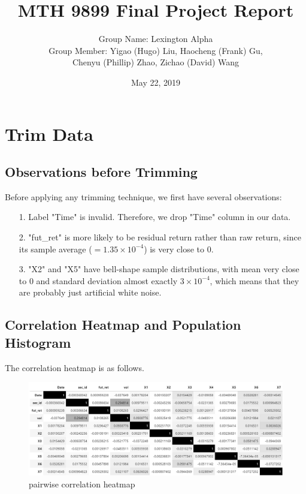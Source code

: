 \documentclass[onecolumn]{article}
\title{MTH 9899 Final Project Report}
\author{Group Name: Lexington Alpha\\
        Group Member: Yigao (Hugo) Liu, Haocheng (Frank) Gu,\\
        Chenyu (Phillip) Zhao, Zichao (David) Wang}
\date{May 22, 2019}
\begin{document}
\maketitle

\section{Trim Data}
\subsection{Observations before Trimming}
Before applying any trimming technique, we first have several observations:
\begin{itemize}
    \item[1.] Label "Time" is invalid. Therefore, we drop "Time" column in our data.
    \item[2.] "fut\_ret" is more likely to be residual return rather than raw return, since its sample average ($=1.35\times10^{-4}$) is very close to 0.
    \item[3.] "X2" and "X5" have bell-shape sample distributions, with mean very close to 0 and standard deviation almost exactly $3\times10^{-4}$, which means that they are probably just artificial white noise.
\end{itemize}

\subsection{Correlation Heatmap and Population Histogram}
The correlation heatmap is as follows.
\begin{figure}[ht]
\centering
\includegraphics[scale=0.7]{corr_heatmap.PNG}
\caption{pairwise correlation heatmap}
\label{fig:label}
\end{figure}
\end{document}
